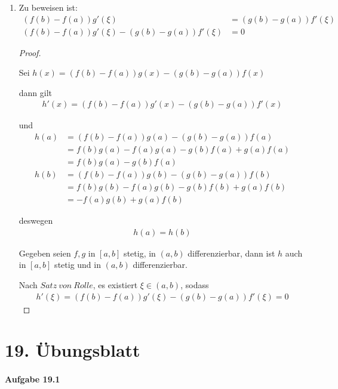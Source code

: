 \documentclass[11pt,a4paper]{article}
\begin{document}
\begin{enumerate}

\item[]

Zu beweisen ist:
\begin{align*}
(f(b)-f(a))g'(\xi)&=(g(b)-g(a))f'(\xi) \\
(f(b)-f(a))g'(\xi)-(g(b)-g(a))f'(\xi)&=0
\end{align*}

\begin{proof}
$ $\newline

Sei $h(x)=(f(b)-f(a))g(x)-(g(b)-g(a))f(x)$

dann gilt
\begin{align*}
h'(x)=(f(b)-f(a))g'(x)-(g(b)-g(a))f'(x)
\end{align*}

und
\begin{align*}
h(a)
&=(f(b)-f(a))g(a)-(g(b)-g(a))f(a) \\
&=f(b)g(a)-f(a)g(a)-g(b)f(a)+g(a)f(a) \\
&=f(b)g(a)-g(b)f(a) \\
h(b)
&=(f(b)-f(a))g(b)-(g(b)-g(a))f(b) \\
&=f(b)g(b)-f(a)g(b)-g(b)f(b)+g(a)f(b) \\
&=-f(a)g(b)+g(a)f(b)
\end{align*}

deswegen
\begin{align*}
h(a)=h(b)
\end{align*}

Gegeben seien $f,g$ in $[a,b]$ stetig, in $(a,b)$ differenzierbar, dann ist $h$ auch in $[a,b]$ stetig und in $(a,b)$ differenzierbar.

Nach $Satz\ von\ Rolle$, es existiert $\xi\in(a,b)$, sodass
\begin{align*}
h'(\xi)=(f(b)-f(a))g'(\xi)-(g(b)-g(a))f'(\xi)=0
\end{align*}

\end{proof}

\end{enumerate}

\newpage

\section{19. Übungsblatt}

\paragraph{Aufgabe 19.1}
\end{document}
